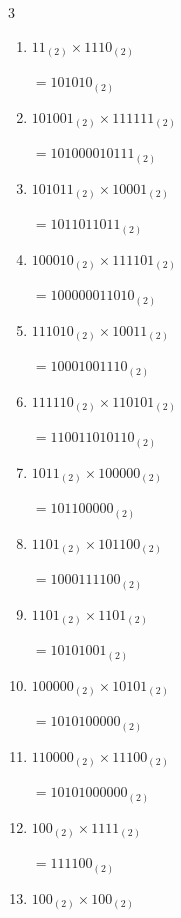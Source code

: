 \begin{multicols}{3}
\begin{enumerate}
\columnbreak %

  \item $11_{(2)} \times 1110_{(2)}$

        $=101010_{(2)}$

  \item $101001_{(2)} \times 111111_{(2)}$

        $=101000010111_{(2)}$

  \item $101011_{(2)} \times 10001_{(2)}$

        $=1011011011_{(2)}$

  \item $100010_{(2)} \times 111101_{(2)}$

        $=100000011010_{(2)}$

  \item $111010_{(2)} \times 10011_{(2)}$

        $=10001001110_{(2)}$

\columnbreak %

\resetques

  \item $111110_{(2)} \times 110101_{(2)}$

        $=110011010110_{(2)}$

  \item $1011_{(2)} \times 100000_{(2)}$

        $=101100000_{(2)}$

  \item $1101_{(2)} \times 101100_{(2)}$

        $=1000111100_{(2)}$

  \item $1101_{(2)} \times 1101_{(2)}$

        $=10101001_{(2)}$

  \item $100000_{(2)} \times 10101_{(2)}$

        $=1010100000_{(2)}$

\columnbreak %

  \item $110000_{(2)} \times 11100_{(2)}$

        $=10101000000_{(2)}$

  \item $100_{(2)} \times 1111_{(2)}$

        $=111100_{(2)}$

  \item $100_{(2)} \times 100_{(2)}$


\end{enumerate}
\end{multicols}
